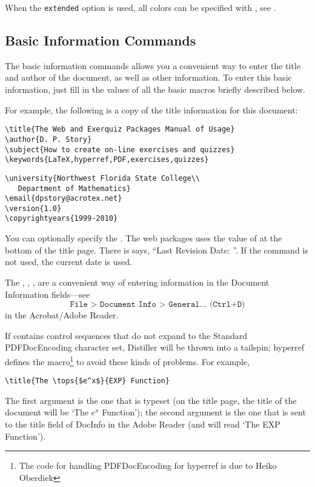 \documentclass{article}
\makeatletter
\let\tops\texorpdfstring
\let\pkg\textsf
\edef\amtIndent{\the\parindent}
\def\FitItIn{\eq@fititin}
\def\endredpoint{\FitItIn{{\large\ifusebw\color{black}\else\color{red}\fi$\blacktriangleleft$}}}
\makeatother
\begin{document}
{\redpoint When the \texttt{extended} option is used, all colors can be
specified with , see
.\endredpoint

\subsection{Basic Information Commands}\label{ss:BIM}

The basic information commands allows you a convenient way to enter the title
and author of the document, as well as other information. To enter this basic
information, just fill in the values of all the basic macros briefly
described below.

For example, the following is a copy of the title information for this
document:
\begin{Verbatim}[xleftmargin=\amtIndent]
% \title,\author,\subject,\keywords are sent to DocInfo
\title{The Web and Exerquiz Packages Manual of Usage}
\author{D. P. Story}
\subject{How to create on-line exercises and quizzes}
\keywords{LaTeX,hyperref,PDF,exercises,quizzes}
\end{Verbatim}

\begin{Verbatim}[xleftmargin=\amtIndent]
% \university,\email,\version are used only on title page
\university{Northwest Florida State College\\
   Department of Mathematics}
\email{dpstory@acrotex.net}
\version{1.0}
\copyrightyears{1999-2010}
\end{Verbatim}
You can optionally specify the . The web packages uses the value of 
at the bottom of the title page. There is says, ``Last Revision Date: ''. If
the  command is not used, the current date is used.

\redpoint The , , , 
are a convenient way of entering information in the Document
Information fields---see
\begin{equation*}
\texttt{File > Document Info > General... (Ctrl+D)}
\end{equation*}
in the Acrobat/Adobe Reader.\endredpoint

\newtopic\indent If  contains control sequences that do not expand to the
Standard PDFDocEncoding character set, Distiller will be thrown
into a tailspin; \pkg{hyperref} defines the 
macro\footnote{The code for handling PDFDocEncoding for
\pkg{hyperref} is due to Heiko Oberdiek} to avoid these kinds
of problems.  For example,
\begin{Verbatim}[xleftmargin=\amtIndent]
\title{The \tops{$e^x$}{EXP} Function}
\end{Verbatim}
\noindent The first argument is the one that is typeset (on the title page,
the title of the document will be `The $e^x$ Function'); the
second argument is the one that is sent to the title field of
DocInfo in the Adobe Reader (and will read `The EXP Function').

}
\end{document}
